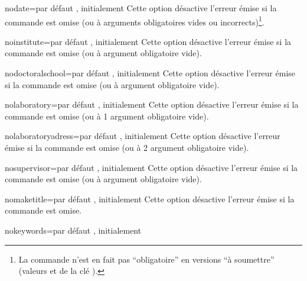 \begin{description}
\begin{docKey}{nodate}{=\textbar{}}{par défaut
      , initialement }
    Cette option désactive l'erreur émise si la commande  est
    omise (ou à arguments obligatoires vides ou incorrects)\footnote{La
      commande  n'est en fait pas \enquote{obligatoire} en
      versions \enquote{à soumettre} (valeurs  et
       de la clé ).}.
  \end{docKey}
  \begin{docKey}{noinstitute}{=\textbar{}}{par
      défaut , initialement }
    Cette option désactive l'erreur émise si la commande  est
    omise (ou à argument obligatoire vide).
  \end{docKey}
  \begin{docKey}{nodoctoralschool}{=\textbar{}}{par
      défaut , initialement }
    Cette option désactive l'erreur émise si la commande
     est omise (ou à argument obligatoire vide).
  \end{docKey}
  \begin{docKey}{nolaboratory}{=\textbar{}}{par
      défaut , initialement }
    Cette option désactive l'erreur émise si la commande 
    est omise (ou à 1\ier{} argument obligatoire vide).
  \end{docKey}
  \begin{docKey}{nolaboratoryadress}{=\textbar{}}{par
      défaut , initialement }
    Cette option désactive l'erreur émise si la commande 
    est omise (ou à 2\ieme{} argument obligatoire vide).
  \end{docKey}
  \begin{docKey}{nosupervisor}{=\textbar{}}{par
      défaut , initialement }
    Cette option désactive l'erreur émise si la commande 
    est omise (ou à argument obligatoire vide).
  \end{docKey}
  \begin{docKey}{nomaketitle}{=\textbar{}}{par
      défaut , initialement }
    Cette option désactive l'erreur émise si la commande  est
    omise.
  \end{docKey}
  \begin{docKey}{nokeywords}{=\textbar{}}{par
      défaut , initialement }

\end{docKey}
\end{description}
